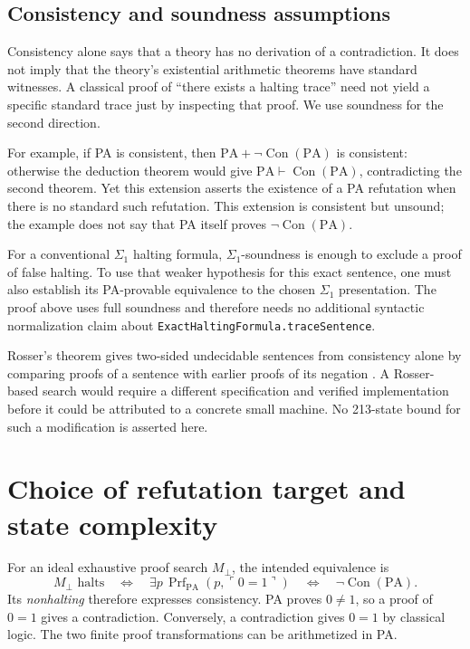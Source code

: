 \documentclass[11pt,letterpaper]{article}
\newcommand{\PA}{\mathrm{PA}}
\newcommand{\Con}{\operatorname{Con}}
\newcommand{\Prf}{\operatorname{Prf}}
\newcommand{\code}[1]{\ulcorner #1\urcorner}
\begin{document}
\subsection{Consistency and soundness assumptions}

Consistency alone says that a theory has no derivation of a contradiction.
It does not imply that the theory's existential arithmetic theorems have
standard witnesses. A classical proof of ``there exists
a halting trace'' need not yield a specific standard trace just by
inspecting that proof. We use soundness for the second direction.

For example, if PA is consistent, then
$\PA+\neg\Con(\PA)$ is consistent: otherwise the deduction theorem
would give $\PA\vdash\Con(\PA)$, contradicting the second theorem.
Yet this extension asserts the existence of a PA refutation when there
is no standard such refutation. This extension is consistent but unsound;
the example does not say that PA itself proves $\neg\Con(\PA)$.

For a conventional $\Sigma_1$ halting formula, $\Sigma_1$-soundness is
enough to exclude a proof of false halting. To use that weaker hypothesis
for this exact sentence, one must also establish its PA-provable
equivalence to the chosen $\Sigma_1$ presentation. The proof above uses
full soundness and therefore needs no additional syntactic normalization
claim about \texttt{ExactHaltingFormula.traceSentence}.

Rosser's theorem gives two-sided undecidable sentences from consistency
alone by comparing proofs of a sentence with earlier proofs of its
negation \cite{rosser}. A Rosser-based search would require a different
specification and verified implementation before it could be attributed
to a concrete small machine. No 213-state bound for such a modification
is asserted here.

\section{Choice of refutation target and state complexity}\label{sec:zero-one}

For an ideal exhaustive proof search $M_{\bot}$, the intended equivalence is
\[
M_{\bot}\text{ halts}
\quad\Longleftrightarrow\quad
\exists p\,\Prf_{\PA}(p,\code{0=1})
\quad\Longleftrightarrow\quad \neg\Con(\PA).
\]
Its \emph{nonhalting} therefore expresses consistency. PA proves
$0\ne1$, so a proof of $0=1$ gives a contradiction. Conversely, a
contradiction gives $0=1$ by classical logic. The two finite
proof transformations can be arithmetized in PA.
\end{document}
